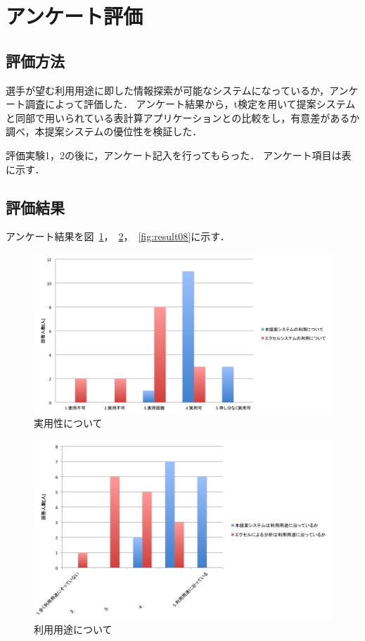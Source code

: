 \documentclass[sotsuron]{kuee}
\begin{document}
	\section{アンケート評価}
		\subsection{評価方法}
			選手が望む利用用途に即した情報探索が可能なシステムになっているか，アンケート調査によって評価した．
			アンケート結果から，t検定を用いて提案システムと同部で用いられている表計算アプリケーションとの比較をし，有意差があるか調べ，本提案システムの優位性を検証した．
			
			評価実験1，2の後に，アンケート記入を行ってもらった．
			アンケート項目は表に示す．
		\subsection{評価結果}
		アンケート結果を図~\ref{fig:result06}，~\ref{fig:result07}，~\ref{fig:result08}に示す．
			\begin{figure}
				\begin{center}
					\includegraphics[width=\linewidth]{./png/result06.png}
				\end{center}
				\caption{実用性について}
		  		\label{fig:result06}
			\end{figure}
			\begin{figure}
				\begin{center}
					\includegraphics[width=\linewidth]{./png/result07.png}
				\end{center}
				\caption{利用用途について}
		  		\label{fig:result07}
			\end{figure}
\end{document}
